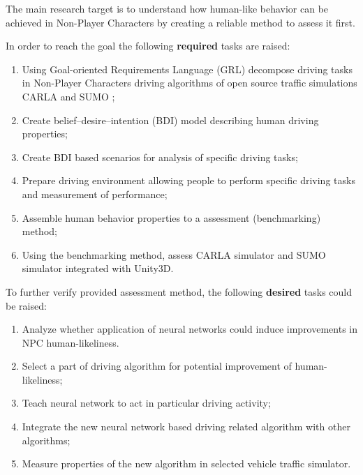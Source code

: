 \documentclass{VUMIFPS-master-intro}
\begin{document}

The main research target is to understand how human-like behavior can be achieved in Non-Player Characters by creating a reliable method to assess it first.

In order to reach the goal the following \textbf{required} tasks are raised:
\begin{enumerate}
	\item Using Goal-oriented Requirements Language (GRL) decompose driving tasks in Non-Player Characters driving algorithms of open source traffic simulations CARLA \cite{Dosovitskiy2017} and SUMO \cite{Biurrun2017};
	\item Create belief–desire–intention (BDI) model describing human driving properties;
	\item Create BDI based scenarios for analysis of specific driving tasks;
	\item Prepare driving environment allowing people to perform specific driving tasks and measurement of performance;
	\item Assemble human behavior properties to a assessment (benchmarking) method;
	\item Using the benchmarking method, assess CARLA simulator and SUMO simulator integrated with Unity3D.
\end{enumerate}

To further verify provided assessment method, the following \textbf{desired} tasks could be raised:
\begin{enumerate}
	\item Analyze whether application of neural networks could induce improvements in NPC human-likeliness.
	\item Select a part of driving algorithm for potential improvement of human-likeliness;
	\item Teach neural network to act in particular driving activity;
	\item Integrate the new neural network based driving related algorithm with other algorithms;
	\item Measure properties of the new algorithm in selected vehicle traffic simulator.
\end{enumerate}

\end{document}
